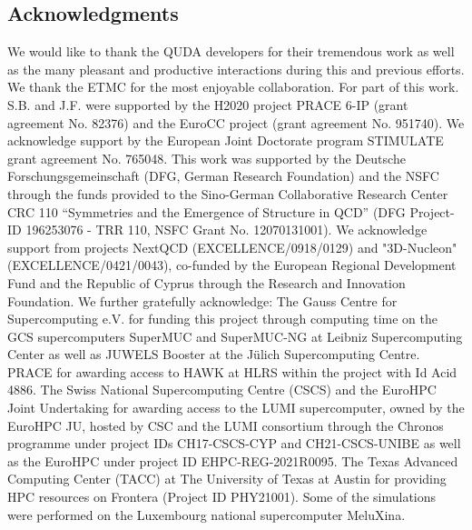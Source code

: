\documentclass[a0,portrait]{a0poster}
\begin{document}
\begin{multicols}{2}

    \subsection*{Acknowledgments}
    \small 
    We would like to thank the QUDA developers for their tremendous work as well as the many pleasant and productive
    interactions during this and previous efforts. We thank the ETMC for the most enjoyable collaboration. 
    For part of this work. S.B. and J.F. were supported by the H2020 project PRACE 6-IP (grant agreement No. 82376) and the EuroCC project (grant agreement No. 951740).
    We acknowledge support by the European Joint Doctorate program STIMULATE grant agreement No. 765048.
    This work was supported by the Deutsche Forschungsgemeinschaft (DFG, German Research Foundation) and the NSFC through the funds provided to the Sino-German Collaborative Research Center CRC 110 “Symmetries and the Emergence of Structure in QCD” (DFG Project-ID 196253076 - TRR 110, NSFC Grant No. 12070131001).
    We acknowledge support from projects NextQCD (EXCELLENCE/0918/0129) and "3D-Nucleon" (EXCELLENCE/0421/0043), co-funded by the European Regional Development Fund and the Republic of Cyprus through the Research and Innovation Foundation. 
    We further gratefully acknowledge: The Gauss Centre for Supercomputing e.V. for funding this project through computing time on the GCS supercomputers SuperMUC and SuperMUC-NG at Leibniz Supercomputing Center as well as JUWELS Booster at the Jülich Supercomputing Centre.
    PRACE for awarding access to HAWK at HLRS within the project with Id Acid 4886. 
    The Swiss National Supercomputing Centre (CSCS) and the EuroHPC Joint Undertaking for awarding access to the LUMI supercomputer, owned by the EuroHPC JU, hosted by CSC and the LUMI consortium through the Chronos programme under project IDs CH17-CSCS-CYP and CH21-CSCS-UNIBE as well as the EuroHPC under project ID EHPC-REG-2021R0095.
    The Texas Advanced Computing Center (TACC) at The University of Texas at Austin for providing HPC resources on Frontera (Project ID PHY21001).
    Some of the simulations were performed on the Luxembourg national supercomputer MeluXina.



\end{multicols}
\end{document}
